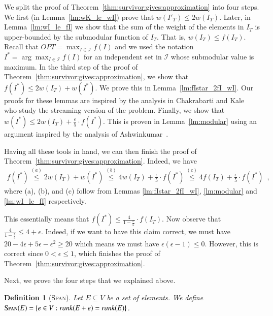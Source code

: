 \documentclass[11pt]{article}
\newtheorem{definition}{Definition}[section]
\newcommand{\spn}{{\textsc{Span}}}
\begin{document}
We split the proof of Theorem~\ref{thm:survivor:gives:approximation} into four steps.
We first (in Lemma~\ref{lm:wK_le_wI}) prove that $w(I'_T) \le 2w(I_T)$. 
Later, in Lemma~\ref{lm:wI_le_fI}  we show that the sum of the weight of the elements in $I_T$ 
is upper-bounded by the submodular function of $I_T$.  That is, $w(I_T) \le f(I_T)$. 
Recall that $OPT = \max_{I \in \mathcal{I}} f(I)$ and we used the notation 
$I^* = \arg\max_{I \in \mathcal{I}} f(I) $ 
for an independent set in $\mathcal{I}$ whose submodular value is maximum. 
In the third step of the proof of Theorem~\ref{thm:survivor:gives:approximation}, 
we show that $f(I^*) \le 2w(I_T) + w(I^*)$. We prove this in Lemma~\ref{lm:fIstar_2fI_wI}.
Our proofs for these lemmas are inspired by the analysis
in Chakrabarti and Kale~\cite{chakrabarti2015submodular} who study
the streaming version of the problem.
Finally, we show that $w(I^*) \le  2w(I_T) + \frac{\epsilon}{5} \cdot f(I^*)$.
This is proven in Lemma~\ref{lm:modular} using an argument
inspired by the analysis of Ashwinkumar~\cite{badanidiyuru2011buyback}.

Having all these tools in hand, we can then finish the proof of 
Theorem~\ref{thm:survivor:gives:approximation}. 
Indeed, we have 
    \begin{align}
        f(I^*) \overset{(a)}{\le} 2w(I_T) + w(I^*) \overset{(b)}{\le} 4w(I_T) + \frac{\epsilon}{5} \cdot f(I^*) \overset{(c)}{\le} 4f(I_T) + \frac{\epsilon}{5} \cdot f(I^*) \enspace,
    \end{align}
    where (a), (b), and (c) follow from Lemmas \ref{lm:fIstar_2fI_wI}, 
    \ref{lm:modular} and \ref{lm:wI_le_fI} respectively.
    
This essentially means that     
$f(I^*) \le \frac{4}{1-\frac{\epsilon}{5}} \cdot f(I_T)$. 
Now observe that $\frac{4}{1-\frac{\epsilon}{5}} \le 4+\epsilon$. 
Indeed, if we want to have this claim correct, we must have $20 - 4\epsilon + 5\epsilon - \epsilon^2 \ge 20$ 
which means we must have $ \epsilon(\epsilon-1) \le 0$. 
However, this is correct since $0 < \epsilon \le 1$, which finishes the proof of Theorem~\ref{thm:survivor:gives:approximation}. 




Next, we prove the four steps that we explained above. 


\begin{definition}[\spn]
\label{def:matroid:span}
    Let $E \subseteq V$ be a set of elements. We define $\spn(E) = \{e \in V : rank(E + e) = rank(E) \}$.
\end{definition}
\end{document}
